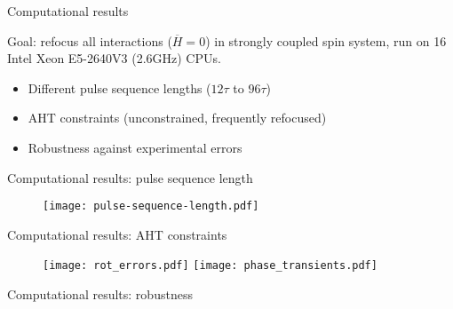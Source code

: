 \documentclass{beamer}
\begin{document}
\begin{frame}{Computational results}



Goal: refocus all interactions (\(\overline{H}=0\)) in strongly coupled spin system, run on 16 Intel Xeon E5-2640V3 (2.6GHz) CPUs.

\begin{itemize}
    \item Different pulse sequence lengths ($12\tau$ to $96\tau$)
    \item AHT constraints (unconstrained, frequently refocused)
    \item Robustness against experimental errors
\end{itemize}

\end{frame}

\begin{frame}{Computational results: pulse sequence length}

\begin{figure}
\centering
\texttt{[image: pulse-sequence-length.pdf]}
\end{figure}


\end{frame}


\begin{frame}{Computational results: AHT constraints}

\begin{figure}
\centering
\texttt{[image: rot\_errors.pdf]}
\texttt{[image: phase\_transients.pdf]}
\end{figure}

\end{frame}


\begin{frame}{Computational results: robustness}


\end{frame}
\end{document}
